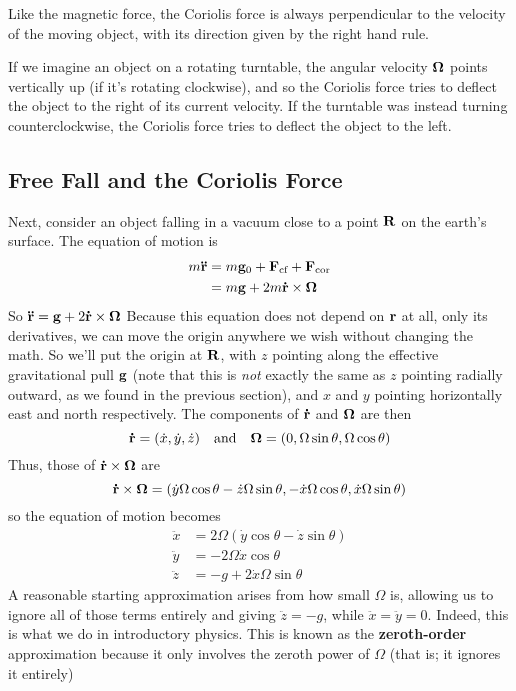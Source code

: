 Like the magnetic force, the Coriolis force is always perpendicular to the velocity of the moving object, with its direction given by the right hand rule. 

If we imagine an object on a rotating turntable, the angular velocity $\boldsymbol{\Omega}$ points vertically up (if it's rotating clockwise), and so the Coriolis force tries to deflect the object to the right of its current velocity. If the turntable was instead turning counterclockwise, the Coriolis force tries to deflect the object to the left. 

\subsection*{Free Fall and the Coriolis Force}
Next, consider an object falling in a vacuum close to a point $\mathbf{R}$ on the earth's surface. The equation of motion is
\begin{align*}
    m\mathbf{\ddot r} &=m\mathbf{g}_0 + \mathbf{F}_\text{cf} + \mathbf{F}_\text{cor} \\
    &=m\mathbf{g} + 2m\mathbf{\dot r} \times \boldsymbol{\Omega}
\end{align*}
So $\mathbf{\ddot r} = \mathbf{g} + 2\mathbf{\dot r}\times\boldsymbol{\Omega}$ Because this equation does not depend on $\mathbf{r}$ at all, only its derivatives, we can move the origin anywhere we wish without changing the math. So we'll put the origin at $\mathbf{R}$, with $z$ pointing along the effective gravitational pull $\mathbf{g}$ (note that this is \textit{not} exactly the same as $z$ pointing radially outward, as we found in the previous section), and $x$ and $y$ pointing horizontally east and north respectively. The components of $\mathbf{\dot r}$ and $\boldsymbol{\Omega}$ are then
\[ \mathbf{\dot r} = (\dot x, \dot y,\dot z)\quad\text{and}\quad \boldsymbol{\Omega} = (0, \Omega\sin\theta, \Omega\cos\theta) \]
Thus, those of $\mathbf{\dot r}\times\boldsymbol{\Omega}$ are 
\[ \mathbf{\dot r}\times\boldsymbol{\Omega} = (\dot y\Omega\cos\theta-\dot z\Omega\sin\theta, -\dot x\Omega\cos\theta, \dot x\Omega\sin\theta)\]
so the equation of motion becomes
\begin{align*}
    \ddot x &= 2\Omega(\dot y\cos\theta - \dot z\sin\theta) \\
    \ddot y &= -2\Omega\dot x\cos\theta \\
    \ddot z &= -g + 2\dot x\Omega\sin\theta
\end{align*}
A reasonable starting approximation arises from how small $\Omega$ is, allowing us to ignore all of those terms entirely and giving $\ddot z = -g$, while $\ddot x=\ddot y = 0$. Indeed, this is what we do in introductory physics. This is known as the \textbf{zeroth-order} approximation because it only involves the zeroth power of $\Omega$ (that is; it ignores it entirely)

